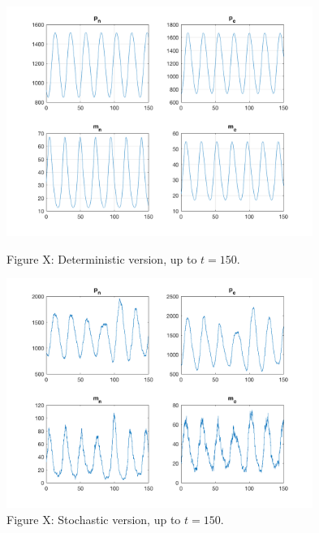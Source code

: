 \documentclass[12pt]{article}
\renewcommand{\(}{\left (}
\renewcommand{\)}{\right )}
\begin{document}
\begin{figure} [h]
    \centering
	\begin{minipage}{0.45\textwidth}
		\centering
		\includegraphics[width=0.89\textwidth]{single_oscillator_zoom_out.png}
		\caption*{\small Figure X: Deterministic version, up to $t=150.$}
	\end{minipage}
	\begin{minipage}{0.45\textwidth}
		\centering
		\includegraphics[width=0.89\textwidth]{sto_single_oscillator_zoom_out.png}
		\caption*{\small Figure X: Stochastic version, up to $t=150.$}
	\end{minipage}
\end{figure}
\end{document}
